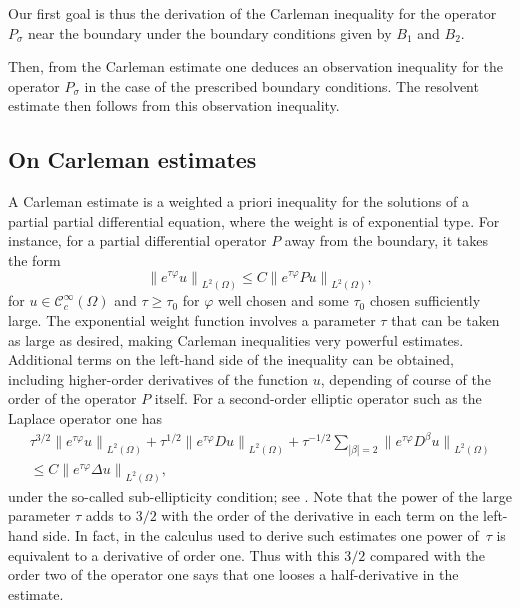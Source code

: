 \documentclass[10pt]{amsart}
\theoremstyle{plain}
\theoremstyle{definition}
\newcommand{\suff}{sufficiently\xspace}
\newcommand{\Norm}[2]{{\| #1 \|}_{#2}}
\newcommand{\Psig}{P_{\sigma}}
\newcommand{\Con}{\ensuremath{\mathscr C}}
\newcommand{\Cinfc}{\ensuremath{\Con^\infty_c}}
\begin{document}
Our first goal is thus the derivation of the Carleman inequality for
the operator $\Psig$ near the boundary under the boundary conditions
given by $B_1$ and $B_2$.

Then, from the Carleman estimate one deduces an observation inequality
for the operator $\Psig$ in the case of the prescribed boundary
conditions. The resolvent estimate then follows from this observation inequality.

\subsection{On Carleman estimates}
A Carleman estimate is a weighted a priori inequality for the solutions of a partial partial differential equation, where the weight is of exponential type.
For instance, for a partial differential operator $P$ away from the boundary, it takes the form
\begin{equation*}
\Norm{e^{\tau\varphi}u}{L^2(\Omega)}
\leq C \Norm{e^{\tau\varphi} P u}{L^2(\Omega)},
\end{equation*}
for $u \in \Cinfc(\Omega)$ and $\tau\geq\tau_0$ for $\varphi$ well
chosen and some $\tau_0$ chosen \suff large. The exponential weight
function involves a parameter $\tau$ that can be taken as large as
desired, making Carleman inequalities very powerful estimates.
Additional terms on the left-hand side of the inequality can be
obtained, including higher-order derivatives of the function $u$,
depending of course of the order of the operator $P$ itself.
For a second-order elliptic operator such as the Laplace operator one
has
\begin{multline*}
\tau^{3/2}\Norm{e^{\tau\varphi}u}{L^2(\Omega)}
+ \tau^{1/2}\Norm{e^{\tau\varphi} D u}{L^2(\Omega)}
+ \tau^{-1/2}\sum_{|\beta|=2}\Norm{e^{\tau\varphi} D^\beta u}{L^2(\Omega)}\\[
-5pt]
\leq C \Norm{e^{\tau\varphi} \Delta u}{L^2(\Omega)},
\end{multline*}
under the so-called sub-ellipticity condition; see
\cite[Chap.\,3]{JGL-vol1}. Note that the power of the large parameter $\tau$
adds to $3/2$ with the order of the derivative in each term on the
left-hand side. In fact, in the calculus used to derive such estimates
one power of~$\tau$ is equivalent to a derivative of order one. Thus
with this $3/2$ compared with the order two of the operator one says
that one looses a half-derivative in the estimate.
\end{document}
